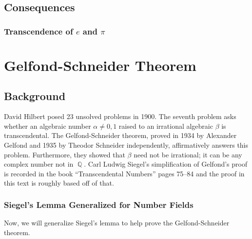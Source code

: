 \documentclass[a4paper, 11pt]{book}
\DeclareMathOperator{\Q}{\mathbb{Q}}
\begin{document}
\section{Consequences}

\subsection{Transcendence of \texorpdfstring{$e$}{LaTeX} and \texorpdfstring{$\pi$}{LaTeX}}
\begin{mybox}
    \par
\end{mybox}

\chapter{Gelfond-Schneider Theorem}
\section{Background}
David Hilbert posed 23 unsolved problems in 1900. The seventh problem asks whether an algebraic number $\alpha \neq 0, 1$ raised to an irrational algebraic $\beta$ is transcendental. The Gelfond-Schneider theorem, proved in 1934 by Alexander Gelfond and 1935 by Theodor Schneider independently, affirmatively answers this problem. Furthermore, they showed that $\beta$ need not be irrational; it can be any complex number not in $\Q$. Carl Ludwig Siegel's simplification of Gelfond's proof is recorded in the book \enquote{Transcendental Numbers} pages 75--84 and the proof in this text is roughly based off of that.\par 

\subsection{Siegel's Lemma Generalized for Number Fields}
Now, we will generalize Siegel's lemma to help prove the Gelfond-Schneider theorem.\par
\end{document}

